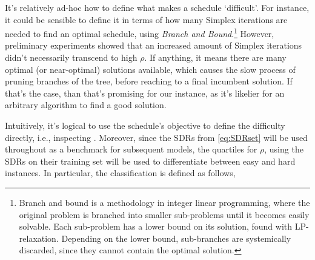 It's relatively ad-hoc how to define what makes a schedule `difficult'. 
For instance, it could be sensible to define it in terms of how many Simplex 
iterations are needed to find an optimal schedule, using \emph{Branch and 
Bound}.\footnote{Branch and bound \citep{bnb} is a methodology in integer
    linear programming, where the original problem is branched into smaller 
    sub-problems until it becomes easily solvable. Each sub-problem has a lower 
    bound on its solution, found with LP-relaxation. Depending on the lower 
    bound, sub-branches are systemically discarded, since they cannot contain 
    the optimal solution.} 
However, preliminary experiments showed that an increased amount of Simplex 
iterations didn't necessarily transcend to high $\rho$. 
If anything, it means there are many optimal (or near-optimal) solutions 
available, which causes the slow process of pruning branches of the tree, 
before reaching to a final incumbent solution. If that's the case, than that's 
promising for our instance, as it's likelier for an arbitrary algorithm to find 
a good solution. 

\clearpage

Intuitively, it's logical to use the schedule's objective to define the 
difficulty directly, i.e., inspecting \namerho. Moreover, since the SDRs from 
\cref{eq:SDRset} will be used throughout as a benchmark for subsequent models, 
the quartiles for $\rho$, using the SDRs on their training set will be used 
to differentiate between easy and hard instances. In particular, the 
classification is defined as follows, 

